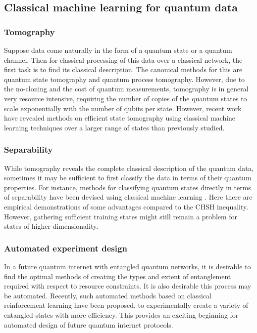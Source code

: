\documentclass[twocolumn, aps, rmp, amsmath, amssymb, nofootinbib, superscriptaddress, longbibliography, floatfix, table-of-contents, eqsecnum]{revtex4-2}
\begin{document}
\subsection{Classical machine learning for quantum data}

\subsubsection{Tomography}

Suppose data come naturally in the form of a quantum state or a quantum channel. Then for classical processing of this data over a classical network, the first task is to find its classical description. The canonical methods for this are quantum state tomography and quantum process tomography. However, due to the no-cloning and the cost of quantum measurements, tomography is in general very resource intensive, requiring the number of copies of the quantum states to scale exponentially with the number of qubits per state. However, recent work have revealed methods on efficient state tomography using classical machine learning techniques \cite{Torlai2017, Han2017} over a larger range of states than previously studied.

\subsubsection{Separability}

While tomography reveals the complete classical description of the quantum data, sometimes it may be sufficient to first classify the data in terms of their quantum properties. For instance, methods for classifying quantum states directly in terms of separability have been devised using classical machine learning \cite{Ma2017, Su2017, Gao2018}. Here there are empirical demonstrations of some advantages compared to the CHSH inequality. However, gathering sufficient training states might still remain a problem for states of higher dimensionality.

\subsubsection{Automated experiment design}

In a future quantum internet with entangled quantum networks, it is desirable to find the optimal methods of creating the types and extent of entanglement required with respect to resource constraints. It is also desirable this process may be automated. Recently, such automated methods based on classical reinforcement learning \cite{alexey} have been proposed, to experimentally create a variety of entangled states with more efficiency. This provides an exciting beginning for automated design of future quantum internet protocols. 
\end{document}
